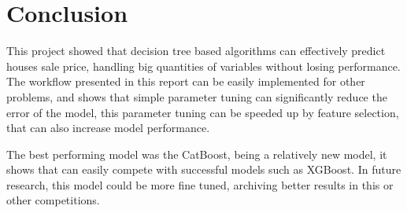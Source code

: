\documentclass[11pt,onecolumn,titlepage,letterpaper]{article}
\begin{document}
\section{Conclusion}

This project showed that decision tree based algorithms can effectively predict houses sale price, handling big quantities of variables without losing performance. The workflow presented in this report can be easily implemented for other problems, and shows that simple parameter tuning can significantly reduce the error of the model, this parameter tuning can be speeded up by feature selection, that can also increase model performance.

The best performing model was the CatBoost, being a relatively new model, it shows that can easily compete with successful models such as XGBoost. In future research, this model could be more fine tuned, archiving better results in this or other competitions.

{\small


}
\end{document}
